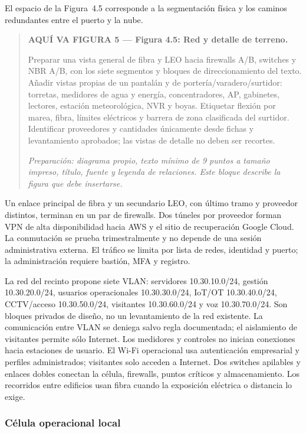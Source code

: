 \documentclass[11pt,letterpaper]{report}
\begin{document}
El espacio de la Figura~4.5 corresponde a la segmentación física y los caminos redundantes entre el puerto y la nube.
\par\medskip
\begin{quote}\textbf{AQUÍ VA FIGURA 5 — Figura 4.5: Red y detalle de terreno.}\par Preparar una vista general de fibra y LEO hacia firewalls A/B, switches y NBR A/B, con los siete segmentos y bloques de direccionamiento del texto. Añadir vistas propias de un pantalán y de portería/varadero/surtidor: torretas, medidores de agua y energía, concentradores, AP, gabinetes, lectores, estación meteorológica, NVR y boyas. Etiquetar flexión por marea, fibra, límites eléctricos y barrera de zona clasificada del surtidor. Identificar proveedores y cantidades únicamente desde fichas y levantamiento aprobados; las vistas de detalle no deben ser recortes.\par\textit{Preparación: diagrama propio, texto mínimo de 9 puntos a tamaño impreso, título, fuente y leyenda de relaciones. Este bloque describe la figura que debe insertarse.}\end{quote}
\par\medskip

Un enlace principal de fibra y un secundario LEO, con último tramo y proveedor distintos, terminan en un par de firewalls. Dos túneles por proveedor forman VPN de alta disponibilidad hacia AWS y el sitio de recuperación Google Cloud. La conmutación se prueba trimestralmente y no depende de una sesión administrativa externa. El tráfico se limita por lista de redes, identidad y puerto; la administración requiere bastión, MFA y registro.

La red del recinto propone siete VLAN: servidores 10.30.10.0/24, gestión 10.30.20.0/24, usuarios operacionales 10.30.30.0/24, IoT/OT 10.30.40.0/24, CCTV/acceso 10.30.50.0/24, visitantes 10.30.60.0/24 y voz 10.30.70.0/24. Son bloques privados de diseño, no un levantamiento de la red existente. La comunicación entre VLAN se deniega salvo regla documentada; el aislamiento de visitantes permite sólo Internet. Los medidores y controles no inician conexiones hacia estaciones de usuario. El Wi-Fi operacional usa autenticación empresarial y perfiles administrados; visitantes solo acceden a Internet. Dos switches apilables y enlaces dobles conectan la célula, firewalls, puntos críticos y almacenamiento. Los recorridos entre edificios usan fibra cuando la exposición eléctrica o distancia lo exige.

\subsubsection*{Célula operacional local}
\end{document}
